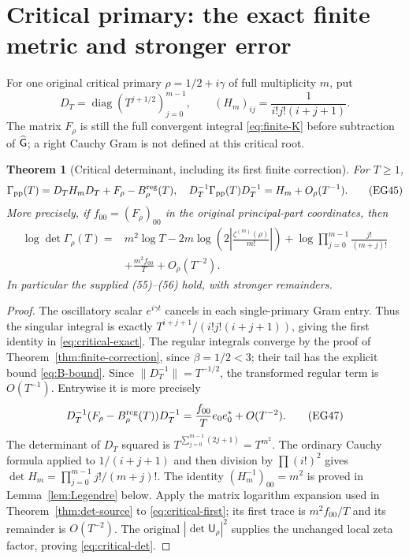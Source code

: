 \documentclass[11pt]{article}
\newtheorem{theorem}{Theorem}[section]
\newcommand{\U}{\mathsf U}\newcommand{\E}{\mathsf E}
\begin{document}
\section{Critical primary: the exact finite metric and stronger error}\label{sec:critical}
For one original critical primary $\rho=1/2+i\gamma$ of full
multiplicity $m$, put
\[
 D_T=\operatorname{diag}(T^{j+1/2})_{j=0}^{m-1},\qquad
 (H_m)_{ij}=\frac1{i!j!(i+j+1)}.
 \tag{EG44}\label{eq:critical-H}
\]
The matrix $F_\rho$ is still the full convergent integral
\eqref{eq:finite-K} before subtraction of $\widehat{\mathsf G}$; a right
Cauchy Gram is not defined at this critical root.

\begin{theorem}[Critical determinant, including its first finite correction]
\label{thm:critical}
For $T\ge1$,
\[
 \Gamma_{\rm pp}(T)=D_TH_mD_T+F_\rho-B_\rho^{\rm reg}(T),
 \quad D_T^{-1}\Gamma_{\rm pp}(T)D_T^{-1}=H_m+O_\rho(T^{-1}).
 \tag{EG45}\label{eq:critical-exact}
\]
More precisely, if $f_{00}=(F_\rho)_{00}$ in the original principal-part
coordinates, then
\[
 \begin{split}
 \log\det\Gamma_\rho(T)={}&m^2\log T
 -2m\log\left(2\left|\frac{\zeta^{(m)}(\rho)}{m!}\right|\right)
 +\log\prod_{j=0}^{m-1}\frac{j!}{(m+j)!}\\
 &+\frac{m^2 f_{00}}T+O_\rho(T^{-2}).
 \end{split}\tag{EG46}\label{eq:critical-det}
\]
In particular the supplied (55)--(56) hold, with stronger remainders.
\end{theorem}
\begin{proof}
The oscillatory scalar $e^{i\gamma t}$ cancels in each single-primary
Gram entry. Thus the singular integral is exactly
$T^{i+j+1}/(i!j!(i+j+1))$, giving the first identity in
\eqref{eq:critical-exact}. The regular integrals converge by the
proof of Theorem~\ref{thm:finite-correction}, since $\beta=1/2<3$;
their tail has the explicit bound \eqref{eq:B-bound}. Since
$\|D_T^{-1}\|=T^{-1/2}$, the transformed regular term is $O(T^{-1})$.
Entrywise it is more precisely
\[
 D_T^{-1}(F_\rho-B_\rho^{\rm reg}(T))D_T^{-1}
                       =\frac{f_{00}}T e_0e_0^*+O(T^{-2}).
 \tag{EG47}\label{eq:critical-first}
\]
The determinant of $D_T$ squared is $T^{\sum_{j=0}^{m-1}(2j+1)}
=T^{m^2}$. The ordinary Cauchy formula applied to $1/(i+j+1)$
and then division by $\prod(i!)^2$ gives
$\det H_m=\prod_{j=0}^{m-1}j!/(m+j)!$.
The identity $(H_m^{-1})_{00}=m^2$ is proved in
Lemma~\ref{lem:Legendre} below. Apply the matrix logarithm expansion
used in Theorem~\ref{thm:det-source} to \eqref{eq:critical-first};
its first trace is $m^2f_{00}/T$ and its remainder is $O(T^{-2})$.
The original $|\det\U_\rho|^2$ supplies the unchanged local zeta
factor, proving \eqref{eq:critical-det}.
\end{proof}
\end{document}
